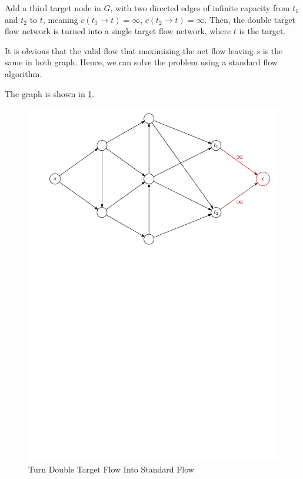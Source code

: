 \documentclass[12pt,letterpaper,titlepage,en-US]{article}
\begin{document}
\begin{homeworkProblem}
\begin{homeworkSubProblem}
\end{homeworkSubProblem}
\begin{homeworkSubProblem}
Add a third target node in $G$, with two directed edges of infinite capacity from $t_1$ and $t_2$ to $t$,
meaning $c(t_1 \rightarrow t) = \infty$, $c(t_2 \rightarrow t) = \infty$.
Then, the double target flow network is turned into a single target flow network,
where $t$ is the target.

It is obvious that the valid flow that maximizing the net flow
leaving $s$ is the same in both graph.
Hence, we can solve the problem using a standard flow algorithm.

The graph is shown in \cref{p4b}.
\begin{figure}[H]
    \caption{Turn Double Target Flow Into Standard Flow}\label{p4b}
    \centering
    \includegraphics[width=.9\textwidth]{p4b}
\end{figure}


\end{homeworkSubProblem}
\end{homeworkProblem}
\end{document}

